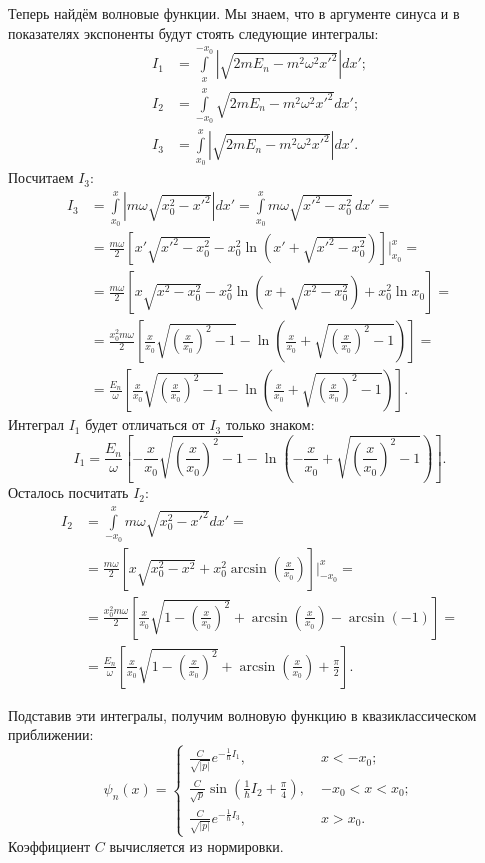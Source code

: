 Теперь найдём волновые функции. Мы знаем, что в аргументе синуса и в
показателях экспоненты будут стоять следующие интегралы:
\begin{align*}
  I_1 &= \int\limits_{x}^{-x_0}\left|\sqrt{2mE_n - m^2\omega^2x'^2}\right|dx';\\
  I_2 &= \int\limits_{-x_0}^{x}\sqrt{2mE_n - m^2\omega^2x'^2}dx';\\
  I_3 &= \int\limits_{x_0}^{x}\left|\sqrt{2mE_n - m^2\omega^2x'^2}\right|dx'.
\end{align*}
Посчитаем $I_3$:
\begin{align*}
  I_3 &= \int\limits_{x_0}^{x}\left|m\omega\sqrt{x_0^2 - x'^2}\right|dx' = \int\limits_{x_0}^{x} m\omega\sqrt{x'^2 - x_0^2}\,dx' = \\
  &= \frac{m\omega}{2}\left[x'\sqrt{x'^2 - x_0^2} - x_0^2\ln (x' + \sqrt{x'^2 - x_0^2} )\right]\Bigg|_{x_0}^{x} = \\
  &= \frac{m\omega}{2}\left[x\sqrt{x^2 - x_0^2} - x_0^2\ln (x + \sqrt{x^2 - x_0^2} ) + x_0^2\ln x_0 \right]= \\
  &= \frac{x_0^2 m\omega}{2} \left[\frac{x}{x_0}\sqrt{\left(\frac{x}{x_0}\right)^2 - 1} - \ln (\frac{x}{x_0} + \sqrt{\left(\frac{x}{x_0}\right)^2 - 1} )\right] = \\
  &=\frac{E_n} {\omega}\left[\frac{x}{x_0}\sqrt{\left(\frac{x}{x_0}\right)^2 - 1} - \ln (\frac{x}{x_0} + \sqrt{ \left(\frac{x}{x_0}\right)^2 - 1} )\right].
\end{align*}
Интеграл $I_1$ будет отличаться от $I_3$ только знаком:
\[
  I_1 = \frac{E_n}{\omega}\left[-\frac{x}{x_0}\sqrt{\left(\frac{x}{x_0}\right)^2 - 1} - \ln (-\frac{x}{x_0} + \sqrt{ \left(\frac{x}{x_0}\right)^2 - 1} )\right].
\]
Осталось посчитать $I_2$:
\begin{align*}
  I_2 &= \int\limits_{-x_0}^{x}m\omega\sqrt{x_0^2 - x'^2}dx' = \\
  & = \frac{m\omega}{2}\left[x\sqrt{x_0^2- x^2} + x_0^2\arcsin\left(\frac{x}{x_0}\right)\right]\Bigg|_{-x_0}^{x} = \\
  & = \frac{x_0^2 m\omega}{2}\left[\frac{x}{x_0}\sqrt{1 - \left(\frac{x}{x_0}\right)^2 } + \arcsin\left(\frac{x}{x_0}\right) - \arcsin(-1)\right] = \\
  & = \frac{E_n}{\omega}\left[\frac{x}{x_0}\sqrt{1 - \left(\frac{x}{x_0}\right)^2} + \arcsin(\frac{x}{x_0}) + \frac{\pi}{2}\right].
\end{align*}

Подставив эти интегралы, получим волновую функцию в квазиклассическом
приближении:
\begin{equation*}
  \psi_n(x) =
  \begin{cases}
    \frac{C}{\sqrt{|p|}}e^{-\frac{1}{\hbar}I_1},\; &x < -x_0;\\
    \frac{C}{\sqrt{p}}\sin(\frac{1}{\hbar}I_2 + \frac{\pi}{4}),\; &-x_0 < x < x_0;\\
    \frac{C}{\sqrt{|p|}}e^{-\frac{1}{\hbar}I_3},\; &x > x_0.
  \end{cases}
\end{equation*}
Коэффициент $C$ вычисляется из нормировки.

